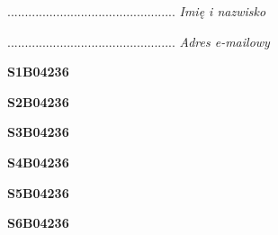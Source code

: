 \begin{turn}{90}\begin{minipage}{\linewidth} \vspace{20mm} ................................................  \textit{Imię i nazwisko}\end{minipage}\end{turn}

\begin{turn}{90}\begin{minipage}{\linewidth} \vspace{20mm} ................................................  \textit{Adres e-mailowy}\end{minipage}\end{turn}

\begin{turn}{90}\huge \begin{minipage}{\linewidth} \vspace{10mm}\textbf{S1B04236}\end{minipage}\end{turn}

\begin{turn}{90}\huge \begin{minipage}{\linewidth} \vspace{10mm}\textbf{S2B04236}\end{minipage}\end{turn}

\begin{turn}{90}\huge \begin{minipage}{\linewidth} \vspace{10mm}\textbf{S3B04236}\end{minipage}\end{turn}

\begin{turn}{90}\huge \begin{minipage}{\linewidth} \vspace{10mm}\textbf{S4B04236}\end{minipage}\end{turn}

\begin{turn}{90}\huge \begin{minipage}{\linewidth} \vspace{10mm}\textbf{S5B04236}\end{minipage}\end{turn}

\begin{turn}{90}\huge \begin{minipage}{\linewidth} \vspace{10mm}\textbf{S6B04236}\end{minipage}\end{turn}

